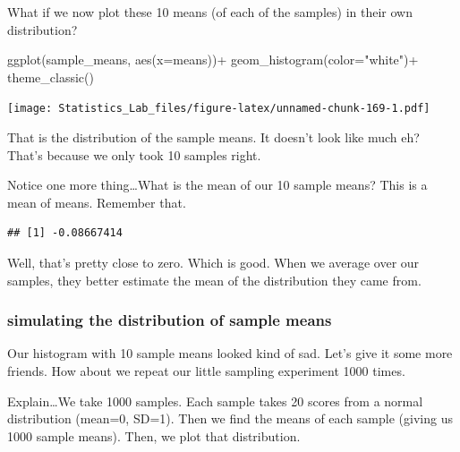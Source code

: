 \documentclass[
]{book}
\newenvironment{Shaded}{\begin{snugshade}}{\end{snugshade}}
\newcommand{\AttributeTok}[1]{\textcolor[rgb]{0.77,0.63,0.00}{#1}}
\newcommand{\FunctionTok}[1]{\textcolor[rgb]{0.00,0.00,0.00}{#1}}
\newcommand{\NormalTok}[1]{#1}
\newcommand{\SpecialCharTok}[1]{\textcolor[rgb]{0.00,0.00,0.00}{#1}}
\newcommand{\StringTok}[1]{\textcolor[rgb]{0.31,0.60,0.02}{#1}}
\begin{document}
What if we now plot these 10 means (of each of the samples) in their own distribution?

\begin{Shaded}
\begin{Highlighting}[]
 \FunctionTok{ggplot}\NormalTok{(sample\_means, }\FunctionTok{aes}\NormalTok{(}\AttributeTok{x=}\NormalTok{means))}\SpecialCharTok{+}
  \FunctionTok{geom\_histogram}\NormalTok{(}\AttributeTok{color=}\StringTok{"white"}\NormalTok{)}\SpecialCharTok{+}
  \FunctionTok{theme\_classic}\NormalTok{()}
\end{Highlighting}
\end{Shaded}

\texttt{[image: Statistics\_Lab\_files/figure-latex/unnamed-chunk-169-1.pdf]}

That is the distribution of the sample means. It doesn't look like much eh? That's because we only took 10 samples right.

Notice one more thing\ldots What is the mean of our 10 sample means? This is a mean of means. Remember that.

\begin{Shaded}
\end{Shaded}

\begin{verbatim}
## [1] -0.08667414
\end{verbatim}

Well, that's pretty close to zero. Which is good. When we average over our samples, they better estimate the mean of the distribution they came from.

\hypertarget{simulating-the-distribution-of-sample-means}{%
\subsubsection{simulating the distribution of sample means}\label{simulating-the-distribution-of-sample-means}}

Our histogram with 10 sample means looked kind of sad. Let's give it some more friends. How about we repeat our little sampling experiment 1000 times.

Explain\ldots We take 1000 samples. Each sample takes 20 scores from a normal distribution (mean=0, SD=1). Then we find the means of each sample (giving us 1000 sample means). Then, we plot that distribution.
\end{document}
